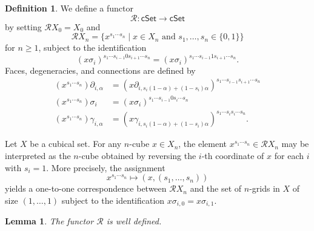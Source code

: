 \documentclass[oneside, 12pt]{amsart}
\numberwithin{equation}{section}
\theoremstyle{plain}
\newtheorem{lemma}[theorem]{Lemma}
\theoremstyle{definition}
\newtheorem{definition}[theorem]{Definition}
\theoremstyle{remark}
\newcommand{\cSet}{\mathsf{cSet}}
\begin{document}
	\begin{definition}
		We define a functor
		\[
		\mathcal{R}\colon\cSet\to\cSet
		\]
		by setting $\mathcal{R}X_0=X_0$ and
		\[
		\mathcal{R}X_n=\{x^{s_1\cdots s_n}\mid x\in X_n\text{ and }s_1,\ldots,s_n\in\{0,1\}\}
		\]
		for $n\ge 1$, subject to the identification
		\begin{equation}
			\label{R identification}
			(x\sigma_i)^{s_1\cdots s_{i-1}0s_{i+1}\cdots s_n}=(x\sigma_i)^{s_1\cdots s_{i-1}1s_{i+1}\cdots s_n}.
		\end{equation}
		Faces, degeneracies, and connections are defined by
		\begin{align*}
			(x^{s_1\cdots s_n})\partial_{i,\alpha}&=(x\partial_{i,s_i(1-\alpha)+(1-s_i)\alpha})^{s_1\cdots s_{i-1}s_{i+1}\cdots s_n}\\
			(x^{s_1\cdots s_n})\sigma_i&=(x\sigma_i)^{s_1\cdots s_{i-1}0s_{i}\cdots s_n}\\
			(x^{s_1\cdots s_n})\gamma_{i,\alpha}&=(x\gamma_{i,s_i(1-\alpha)+(1-s_i)\alpha})^{s_1\cdots s_is_i\cdots s_n}.
		\end{align*}
	\end{definition}
	
	
	
	Let $X$ be a cubical set. For any $n$-cube $x\in X_n$, the element $x^{s_1\cdots s_n}\in\mathcal{R}X_n$ may be interpreted as the $n$-cube obtained by reversing the $i$-th coordinate of $x$ for each $i$ with $s_i=1$. More precisely, the assignment
	\[
	x^{s_1\cdots s_n}\mapsto(x,(s_1,\ldots,s_n))
	\]
	yields a one-to-one correspondence between $\mathcal{R}X_n$ and the set of $n$-grids in $X$ of size $(1,\ldots,1)$ subject to the identification $x\sigma_{i,0}=x\sigma_{i,1}$.
	
	
	
	\begin{lemma}
		The functor $\mathcal{R}$ is well defined.
	\end{lemma}
	
\end{document}
